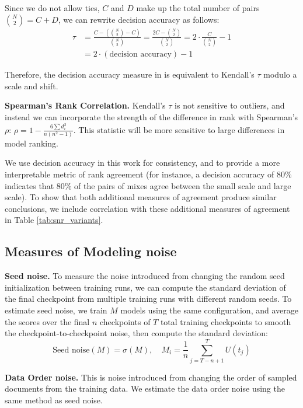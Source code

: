 Since we do not allow ties, $C$ and $D$ make up the total number of pairs $\binom{N}{2} = C + D$, we can rewrite decision accuracy as follows:
\begin{align*}
\tau &= \frac{C - \left( \binom{N}{2} - C \right)}{\binom{N}{2}} = \frac{2C - \binom{N}{2}}{\binom{N}{2}} = 2 \cdot \frac{C}{\binom{N}{2}} - 1 \\
     &= 2 \cdot (\text{decision accuracy}) - 1
\end{align*}

Therefore, the decision accuracy measure in  \citet{magnusson2025datadecide} is equivalent to Kendall's $\tau$ modulo a scale and shift.

\textbf{Spearman's Rank Correlation.} Kendall's $\tau$ is not sensitive to outliers, and instead we can incorporate the strength of the difference in rank with Spearman's $\rho$: $\rho = 1 - \frac{6 \sum d_i^2}{n(n^2 - 1)}$. This statistic will be more sensitive to large differences in model ranking.

We use decision accuracy in this work for consistency, and to provide a more interpretable metric of rank agreement (for instance, a decision accuracy of 80\% indicates that 80\% of the pairs of mixes agree between the small scale and large scale). To show that both additional measures of agreement produce similar conclusions, we include correlation with these additional measures of agreement in Table \ref{tab:snr_variants}.

\subsection{Measures of Modeling noise{}}
\label{app:measuring-noise}

\textbf{Seed noise{}.} To measure the noise{} introduced from changing the random seed initialization between training runs, we can compute the standard deviation of the final checkpoint from multiple training runs with different random seeds. To estimate seed noise{}, we train $M$ models using the same configuration, and average the scores over the final $n$ checkpoints of $T$ total training checkpoints to smooth the checkpoint-to-checkpoint noise{}, then compute the standard deviation:
\begin{equation}
 \text{Seed noise{}}(M) = \sigma(M),\quad M_i = \textstyle\frac{1}{n} \sum_{j=T-n+1}^{T} U(t_j)
\end{equation}

\textbf{Data Order noise{}.} This is noise{} introduced from changing the order of sampled documents from the training data. We estimate the data order noise{} using the same method as seed noise{}.

